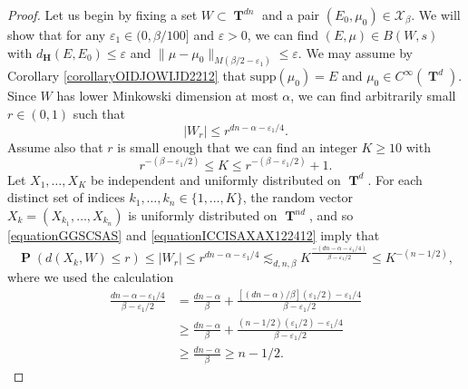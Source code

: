\documentclass[dvipsnames,letterpaper,12pt]{article}
\numberwithin{equation}{section}
\DeclareMathOperator{\TT}{\mathbf{T}}
\numberwithin{theorem}{section}
\DeclareMathOperator{\PP}{\mathbf{P}}
\begin{document}
\begin{proof}
    Let us begin by fixing a set $W \subset \TT^{dn}$ and a pair $(E_0,\mu_0) \in \mathcal{X}_\beta$. We will show that for any $\varepsilon_1 \in (0,\beta/100]$ and $\varepsilon > 0$, we can find $(E,\mu) \in B(W,s)$ with $d_\mathbf{H}(E,E_0) \leq \varepsilon$ and $\| \mu - \mu_0 \|_{M(\beta/2 - \varepsilon_1)} \leq \varepsilon$. We may assume by Corollary \ref{corollaryOIDJOWIJD2212} that $\text{supp}(\mu_0) = E$ and $\mu_0 \in C^\infty(\TT^d)$. Since $W$ has lower Minkowski dimension at most $\alpha$, we can find arbitrarily small $r \in (0,1)$ such that
    \begin{equation} \label{equationGGSCSAS}
        |W_r| \leq r^{dn - \alpha - \varepsilon_1/4}.
    \end{equation}
    Assume also that $r$ is small enough that we can find an integer $K \geq 10$ with
    \begin{equation} \label{equationICCISAXAX122412}
        r^{-(\beta - \varepsilon_1/2)} \leq K \leq r^{-(\beta - \varepsilon_1/2)} + 1.
    \end{equation}
    Let $X_1, \dots, X_K$ be independent and uniformly distributed on $\TT^d$. For each distinct set of indices $k_1, \dots, k_n \in \{ 1, \dots, K \}$, the random vector $X_k = (X_{k_1}, \dots, X_{k_n})$ is uniformly distributed on $\TT^{nd}$, and so \eqref{equationGGSCSAS} and \eqref{equationICCISAXAX122412} imply that
    \begin{equation} \label{equationGGASDCJWIJSFGGGG}
        \PP(d(X_k,W) \leq r) \leq |W_r| \leq r^{dn - \alpha - \varepsilon_1/4} \lesssim_{d,n,\beta} K^{\frac{-(dn - \alpha - \varepsilon_1/4)}{\beta - \varepsilon_1/2}} \leq K^{-(n-1/2)},
    \end{equation}
    where we used the calculation
    \begin{equation}
    \begin{split}
        \frac{dn - \alpha - \varepsilon_1/4}{\beta - \varepsilon_1/2} &= \frac{dn-\alpha}{\beta} + \frac{[(dn - \alpha)/\beta](\varepsilon_1/2) - \varepsilon_1/4}{\beta - \varepsilon_1/2}\\
        &\geq \frac{dn - \alpha}{\beta} + \frac{(n-1/2)(\varepsilon_1/2) - \varepsilon_1/4}{\beta - \varepsilon_1/2}\\
        &\geq \frac{dn - \alpha}{\beta} \geq n - 1/2.
    \end{split}
    \end{equation}

\end{proof}
\end{document}
